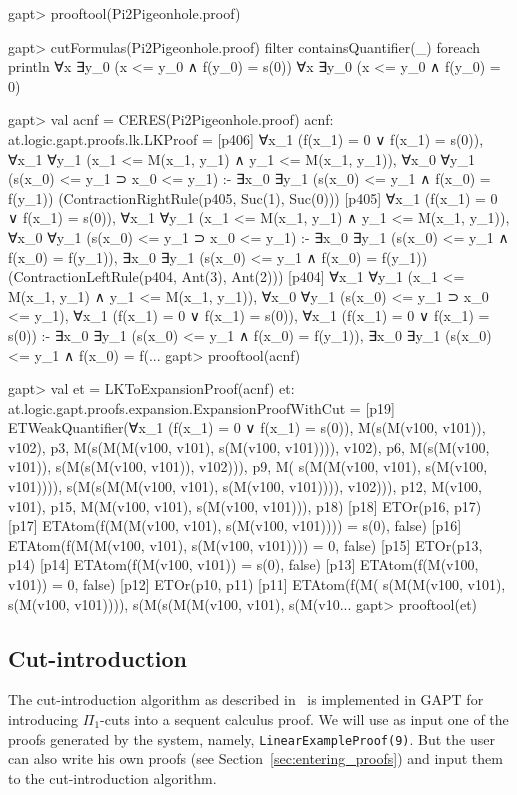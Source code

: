 \documentclass[a4paper,11pt]{article}
\begin{document}
\begin{clilisting}
gapt> prooftool(Pi2Pigeonhole.proof)

gapt> cutFormulas(Pi2Pigeonhole.proof) filter {containsQuantifier(_)} foreach println
∀x ∃y_0 (x <= y_0 ∧ f(y_0) = s(0))
∀x ∃y_0 (x <= y_0 ∧ f(y_0) = 0)

gapt> val acnf = CERES(Pi2Pigeonhole.proof)
acnf: at.logic.gapt.proofs.lk.LKProof =
[p406] ∀x_1 (f(x_1) = 0 ∨ f(x_1) = s(0)),
∀x_1 ∀y_1 (x_1 <= M(x_1, y_1) ∧ y_1 <= M(x_1, y_1)),
∀x_0 ∀y_1 (s(x_0) <= y_1 ⊃ x_0 <= y_1)
:-
∃x_0 ∃y_1 (s(x_0) <= y_1 ∧ f(x_0) = f(y_1))    (ContractionRightRule(p405, Suc(1), Suc(0)))
[p405] ∀x_1 (f(x_1) = 0 ∨ f(x_1) = s(0)),
∀x_1 ∀y_1 (x_1 <= M(x_1, y_1) ∧ y_1 <= M(x_1, y_1)),
∀x_0 ∀y_1 (s(x_0) <= y_1 ⊃ x_0 <= y_1)
:-
∃x_0 ∃y_1 (s(x_0) <= y_1 ∧ f(x_0) = f(y_1)),
∃x_0 ∃y_1 (s(x_0) <= y_1 ∧ f(x_0) = f(y_1))    (ContractionLeftRule(p404, Ant(3), Ant(2)))
[p404] ∀x_1 ∀y_1 (x_1 <= M(x_1, y_1) ∧ y_1 <= M(x_1, y_1)),
∀x_0 ∀y_1 (s(x_0) <= y_1 ⊃ x_0 <= y_1),
∀x_1 (f(x_1) = 0 ∨ f(x_1) = s(0)),
∀x_1 (f(x_1) = 0 ∨ f(x_1) = s(0))
:-
∃x_0 ∃y_1 (s(x_0) <= y_1 ∧ f(x_0) = f(y_1)),
∃x_0 ∃y_1 (s(x_0) <= y_1 ∧ f(x_0) = f(...
gapt> prooftool(acnf)

gapt> val et = LKToExpansionProof(acnf)
et: at.logic.gapt.proofs.expansion.ExpansionProofWithCut =
[p19] ETWeakQuantifier(∀x_1 (f(x_1) = 0 ∨ f(x_1) = s(0)), M(s(M(v100, v101)), v102), p3, M(s(M(M(v100, v101), s(M(v100, v101)))), v102), p6, M(s(M(v100, v101)), s(M(s(M(v100, v101)), v102))), p9, M(
  s(M(M(v100, v101), s(M(v100, v101)))),
  s(M(s(M(M(v100, v101), s(M(v100, v101)))), v102))), p12, M(v100, v101), p15, M(M(v100, v101), s(M(v100, v101))), p18)
[p18] ETOr(p16, p17)
[p17] ETAtom(f(M(M(v100, v101), s(M(v100, v101)))) = s(0), false)
[p16] ETAtom(f(M(M(v100, v101), s(M(v100, v101)))) = 0, false)
[p15] ETOr(p13, p14)
[p14] ETAtom(f(M(v100, v101)) = s(0), false)
[p13] ETAtom(f(M(v100, v101)) = 0, false)
[p12] ETOr(p10, p11)
[p11] ETAtom(f(M(
      s(M(M(v100, v101), s(M(v100, v101)))),
      s(M(s(M(M(v100, v101), s(M(v10...
gapt> prooftool(et)

\end{clilisting}

\subsection{Cut-introduction}\label{sec.cut-introduction}

The cut-introduction algorithm as described in~\cite{Hetzl2012,Hetzl14Algorithmic,Hetzl14Introducing} is
implemented in GAPT for introducing $\Pi_1$-cuts into a sequent calculus
proof. We will use as input one of the proofs generated by
the system, namely, \texttt{LinearExampleProof(9)}. But the user can also
write his own proofs (see Section~\ref{sec:entering_proofs})
and input them to the cut-introduction algorithm.
\end{document}
